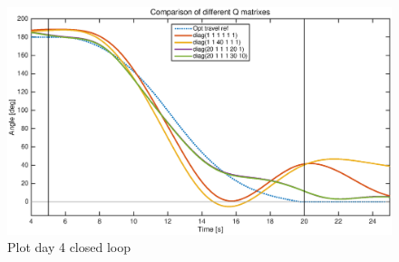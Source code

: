 \begin{figure}[ht!]
    \centering
     \includegraphics[width=1.0\textwidth]{figures/day4_cl/plot_day4_cl_allQ}
    \caption{Plot day 4 closed loop}
    \label{fig:day4_cl_plot_allQ}
\end{figure}


